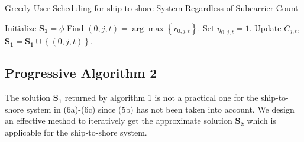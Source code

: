 \documentclass[conference]{IEEEtran}
\begin{document}
\begin{algorithm}[h]
\caption{Greedy User Scheduling for ship-to-shore System Regardless of Subcarrier Count}
\begin{algorithmic}[1]
\STATE Initialize ${{\mathbf{S}}_{\mathbf{1}}}=\phi$
    \STATE Find $\left( {0,j,t} \right) = \arg \max \left\{ {r_{0,j,t}} \right\}$.
    \STATE Set ${\eta _{0,j,t}} = 1$.
    \STATE Update ${C_{j,t}}$, ${{\mathbf{S}}_{\mathbf{1}}}={{\mathbf{S}}_{\mathbf{1}}} \cup \left\{ {\left( {0,j,t} \right)} \right\}$.
  \ENDWHILE
\ENDFOR
\end{algorithmic}
\end{algorithm}



\subsection{Progressive Algorithm 2}

The solution ${{\mathbf{S}}_{\mathbf{1}}}$ returned by algorithm 1 is not a practical one for the ship-to-shore system in (6a)-(6c) since (5b) has not been taken into account. We design an effective method to iteratively get the approximate solution ${{\mathbf{S}}_{\mathbf{2}}}$ which is applicable for the ship-to-shore system. 
\end{document}

